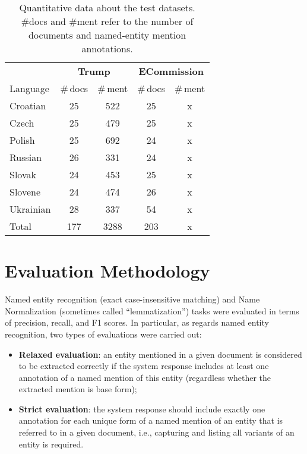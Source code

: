 \documentclass[11pt]{article}
\begin{document}
\begin{table}
\begin{center}
\begin{footnotesize}
\begin{tabular}{lcccc}
\toprule 
 & \multicolumn{2}{c}{\textbf{{\sc Trump}}} & \multicolumn{2}{c}{\textbf{{\sc ECommission}}} \\
\cmidrule(lr){2-3}
\cmidrule(lr){4-5}
Language &  \#\,docs & \#\,ment & \#\,docs & \#\,ment \\
\midrule
Croatian & 25 & 522 & 25 & x \\
Czech & 25 & 479  & 25 & x \\
Polish & 25 & 692  & 24 & x \\
Russian & 26 & 331  & 24 & x \\
Slovak  & 24 & 453  & 25 & x \\
Slovene & 24 & 474  & 26 & x \\
Ukrainian & 28 & 337  & 54 & x \\
\midrule
Total & 177 & 3288  & 203 & x  \\


\bottomrule
\end{tabular}
\end{footnotesize}
\end{center}
\caption{Quantitative data about the test datasets. \#docs and \#ment refer to the number of documents and named-entity mention annotations.}
\label{tab:datasets}
\end{table}


\section{Evaluation Methodology}
\label{sec:evaluation}

Named entity recognition (exact case-insensitive matching) and  Name Normalization (sometimes called “lemmatization”) tasks were evaluated in terms of precision, recall, and F1 scores. In particular, as regards named entity recognition, two types of evaluations were carried out:

\begin{itemize}

\item \textbf{Relaxed evaluation}: an entity mentioned in a given document is considered to be extracted correctly if the system response includes at least one annotation of a named mention of this entity (regardless whether the extracted mention is base form);

\item \textbf{Strict evaluation}: the system response should include exactly one annotation for each unique form of a named mention of an entity that is referred to in a given document, i.e., capturing and listing all variants of an entity is required.

\end{itemize}
\end{document}
